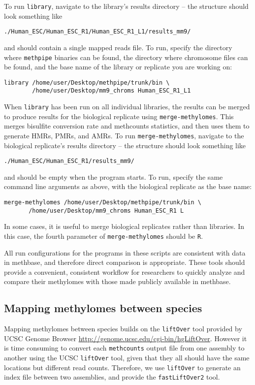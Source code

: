 \documentclass[10pt]{article}
\newcommand{\prog}[1]{\texttt{#1}}
\newcommand{\op}[1]{\texttt{#1}}
\begin{document}
To run \prog{library}, navigate to the library's results directory --
the structure should look something like
\begin{verbatim}
./Human_ESC/Human_ESC_R1/Human_ESC_R1_L1/results_mm9/
\end{verbatim}
and should contain a single mapped reads file. To run, specify the directory
where \prog{methpipe} binaries can be found, the directory where chromosome
files can be found, and the base name of the library or replicate you are
working on:
\begin{verbatim}
library /home/user/Desktop/methpipe/trunk/bin \
        /home/user/Desktop/mm9_chroms Human_ESC_R1_L1
\end{verbatim}

When \prog{library} has been run on all individual libraries, the
results can be merged to produce results for the biological replicate using
\prog{merge-methylomes}. This merges bisulfite conversion rate and methcounts
statistics, and then uses them to generate HMRs, PMRs, and AMRs. To run
\prog{merge-methylomes}, navigate to the biological replicate's results
directory -- the structure should look something like
\begin{verbatim}
./Human_ESC/Human_ESC_R1/results_mm9/
\end{verbatim}
and should be empty when the program starts. To run, specify the same command
line arguments as above, with the biological replicate as the base name:
\begin{verbatim}
merge-methylomes /home/user/Desktop/methpipe/trunk/bin \
       /home/user/Desktop/mm9_chroms Human_ESC_R1 L
\end{verbatim}

In some cases, it is useful to merge biological replicates rather than
libraries. In this case, the fourth parameter of
\prog{merge-methylomes} should be \op{R}.

All run configurations for the programs in these scripts are
consistent with data in methbase, and therefore direct comparison is
appropriate. These tools should provide a convenient, consistent
workflow for researchers to quickly analyze and compare their
methylomes with those made publicly available in methbase.

\subsection{Mapping methylomes between species}
\label{sec:mapp-methyl-betw}
Mapping methylomes between species builds on the \prog{liftOver} tool
provided by UCSC Genome Browser
\url{http://genome.ucsc.edu/cgi-bin/hgLiftOver}. However it is time
consuming to convert each \prog{methcounts} output file from one
assembly to another using the UCSC \prog{liftOver} tool, given that
they all should have the same locations but different read counts. 
Therefore, we use \prog{liftOver} to generate an index file between 
two assemblies, and provide the \prog{fastLiftOver2} tool.
\end{document}
